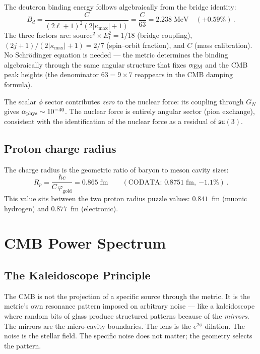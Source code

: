 \documentclass[aps,prd,twocolumn,superscriptaddress,nofootinbib,longbibliography]{revtex4-2}
\newcommand{\kmax}{|\kappa_{\mathrm{max}}|}
\newcommand{\vgold}{\varphi_{\mathrm{gold}}}
\begin{document}
The deuteron binding energy follows algebraically from the bridge
identity:
\begin{equation}\label{eq:deuteron}
  B_d = \frac{C}{(2\ell+1)^2(2\kmax+1)} = \frac{C}{63}
  = 2.238\;\text{MeV} \quad({+0.59\%})\,.
\end{equation}
The three factors are: source$^2 \times E_1^2 = 1/18$ (bridge
coupling), $(2j+1)/(2\kmax+1) = 2/7$ (spin--orbit fraction), and
$C$ (mass calibration).  No Schr\"odinger equation is needed --- the
metric determines the binding algebraically through the same angular
structure that fixes $\alpha_{\rm EM}$ and the CMB peak heights
(the denominator $63 = 9 \times 7$ reappears in the CMB damping
formula).

The scalar $\phi$ sector contributes \emph{zero} to the nuclear
force: its coupling through $G_N$ gives
$\alpha_{\rm phys} \sim 10^{-40}$.  The nuclear force is entirely
angular sector (pion exchange), consistent with the identification
of the nuclear force as a residual of $\mathfrak{su}(3)$.

\subsection{Proton charge radius}

The charge radius is the geometric ratio of baryon to meson
cavity sizes:
\begin{equation}\label{eq:rp}
  R_p = \frac{\hbar c}{C\,\vgold} = 0.865\;\text{fm}
  \qquad(\text{CODATA: }0.8751\;\text{fm},\ {-1.1\%})\,.
\end{equation}
This value sits between the two proton radius puzzle values:
$0.841$~fm (muonic hydrogen) and $0.877$~fm (electronic).

\section{CMB Power Spectrum}\label{sec:cmb}

\subsection{The Kaleidoscope Principle}

The CMB is not the projection of a specific source through the
metric.  It is the metric's own resonance pattern imposed on
arbitrary noise --- like a kaleidoscope where random bits of glass
produce structured patterns because of the \emph{mirrors}.  The
mirrors are the micro-cavity boundaries.  The lens is the $e^{2\phi}$
dilation.  The noise is the stellar field.  The specific noise does
not matter; the geometry selects the pattern.
\end{document}
